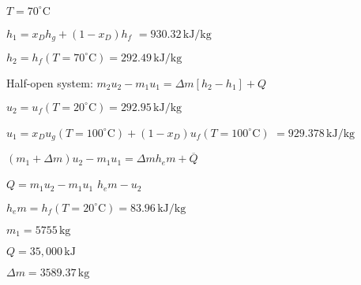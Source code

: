 \( T = 70^\circ \text{C} \)  

\( h_1 = x_D h_g + (1 - x_D) h_f \)  
\( = 930.32 \, \text{kJ/kg} \)  

\( h_2 = h_f (T = 70^\circ \text{C}) = 292.49 \, \text{kJ/kg} \)  

Half-open system:  
\( m_2 u_2 - m_1 u_1 = \Delta m [h_2 - h_1] + Q \)  

\( u_2 = u_f (T = 20^\circ \text{C}) = 292.95 \, \text{kJ/kg} \)  

\( u_1 = x_D u_g (T = 100^\circ \text{C}) + (1 - x_D) u_f (T = 100^\circ \text{C}) \)  
\( = 929.378 \, \text{kJ/kg} \)  

\( (m_1 + \Delta m) u_2 - m_1 u_1 = \Delta m h_em + \overline{Q} \)  

\( Q = m_1 u_2 - m_1 u_1 \)  
\( h_em - u_2 \)  

\( h_em = h_f (T = 20^\circ \text{C}) = 83.96 \, \text{kJ/kg} \)  

\( m_1 = 5755 \, \text{kg} \)  

\( Q = 35,000 \, \text{kJ} \)  

\( \Delta m = 3589.37 \, \text{kg} \)